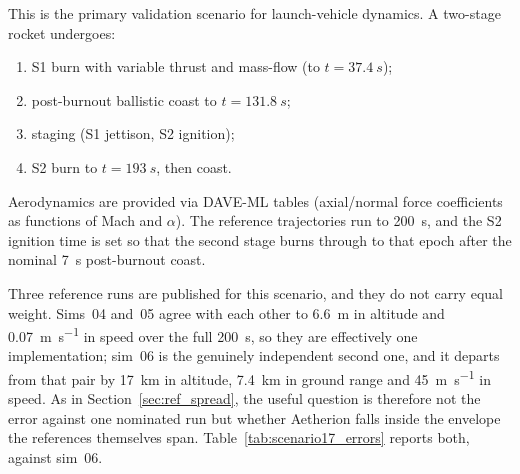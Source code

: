 \documentclass[a4paper,10pt]{article}
\theoremstyle{definition}
\begin{document}
This is the primary validation scenario for launch-vehicle dynamics.  A
two-stage rocket undergoes:
\begin{enumerate}[label=(\roman*)]
  \item S1 burn with variable thrust and mass-flow (to $t = \SI{37.4}{s}$);
  \item post-burnout ballistic coast to $t = \SI{131.8}{s}$;
  \item staging (S1 jettison, S2 ignition);
  \item S2 burn to $t = \SI{193}{s}$, then coast.
\end{enumerate}
Aerodynamics are provided via DAVE-ML tables (axial/normal force coefficients
as functions of Mach and $\alpha$).  The reference trajectories run to
\SI{200}{\second}, and the S2 ignition time is set so that the second stage
burns through to that epoch after the nominal \SI{7}{\second} post-burnout
coast.

Three reference runs are published for this scenario, and they do not carry
equal weight.  Sims~04 and~05 agree with each other to \SI{6.6}{\metre} in
altitude and \SI{0.07}{\metre\per\second} in speed over the full
\SI{200}{\second}, so they are effectively one implementation; sim~06 is the
genuinely independent second one, and it departs from that pair by
\SI{17}{\kilo\metre} in altitude, \SI{7.4}{\kilo\metre} in ground range and
\SI{45}{\metre\per\second} in speed.  As in Section~\ref{sec:ref_spread}, the
useful question is therefore not the error against one nominated run but
whether Aetherion falls inside the envelope the references themselves span.
Table~\ref{tab:scenario17_errors} reports both, against sim~06.
\end{document}
